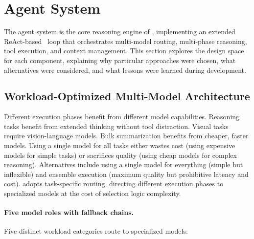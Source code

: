 \section{Agent System}
\label{sec:agent_system}

The agent system is the core reasoning engine of \name, implementing an extended ReAct-based~\cite{yao2023react} loop that orchestrates multi-model routing, multi-phase reasoning, tool execution, and context management. This section explores the design space for each component, explaining why particular approaches were chosen, what alternatives were considered, and what lessons were learned during development.

\subsection{Workload-Optimized Multi-Model Architecture}
\label{sec:multi_model}

Different execution phases benefit from different model capabilities. Reasoning tasks benefit from extended thinking without tool distraction. Visual tasks require vision-language models. Bulk summarization benefits from cheaper, faster models. Using a single model for all tasks either wastes cost (using expensive models for simple tasks) or sacrifices quality (using cheap models for complex reasoning). Alternatives include using a single model for everything (simple but inflexible) and ensemble execution (maximum quality but prohibitive latency and cost). \name adopts task-specific routing, directing different execution phases to specialized models at the cost of selection logic complexity.

\paragraph{Five model roles with fallback chains.} Five distinct workload categories route to specialized models:

